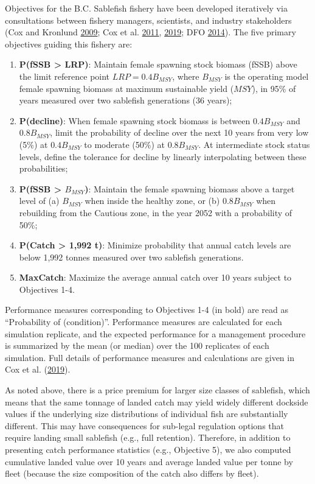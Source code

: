 \documentclass[11pt]{book}
\begin{document}
Objectives for the B.C. Sablefish fishery have been developed iteratively via consultations between fishery managers, scientists, and industry stakeholders (Cox and Kronlund \protect\hyperlink{ref-cox2009evaluation}{2009}; Cox et al. \protect\hyperlink{ref-cox2011management}{2011}, \protect\hyperlink{ref-cox2019evaluating}{2019}; DFO \protect\hyperlink{ref-dfo2014performanc}{2014}). The five primary objectives guiding this fishery are:
\begin{enumerate}
\def\labelenumi{\arabic{enumi}.}

\item
  \textbf{P(fSSB \textgreater{} LRP)}: Maintain female spawning stock biomass (fSSB) above the limit reference point \(LRP = 0.4B_{MSY}\), where \(B_{MSY}\) is the operating model female spawning biomass at maximum sustainable yield (\(MSY\)), in 95\% of years measured over two sablefish generations (36 years);
\item
  \textbf{P(decline)}: When female spawning stock biomass is between \(0.4B_{MSY}\) and \(0.8B_{MSY}\), limit the probability of decline over the next 10 years from very low (5\%) at \(0.4B_{MSY}\) to moderate (50\%) at \(0.8B_{MSY}\). At intermediate stock status levels, define the tolerance for decline by linearly interpolating between these probabilities;
\item
  \textbf{P(fSSB \textgreater{} \(B_{MSY}\))}: Maintain the female spawning biomass above a target level of (a) \(B_{MSY}\) when inside the healthy zone, or (b) \(0.8B_{MSY}\) when rebuilding from the Cautious zone, in the year 2052 with a probability of 50\%;
\item
  \textbf{P(Catch \textgreater{} 1,992 t)}: Minimize probability that annual catch levels are below 1,992 tonnes measured over two sablefish generations.
\item
  \textbf{MaxCatch}: Maximize the average annual catch over 10 years subject to Objectives 1-4.
\end{enumerate}
Performance measures corresponding to Objectives 1-4 (in bold) are read as ``Probability of (condition)''. Performance measures are calculated for each simulation replicate, and the expected performance for a management procedure is summarized by the mean (or median) over the 100 replicates of each simulation. Full details of performance measures and calculations are given in Cox et al. (\protect\hyperlink{ref-cox2019evaluating}{2019}).

As noted above, there is a price premium for larger size classes of sablefish, which means that the same tonnage of landed catch may yield widely different dockside values if the underlying size distributions of individual fish are substantially different. This may have consequences for sub-legal regulation options that require landing small sablefish (e.g., full retention). Therefore, in addition to presenting catch performance statistics (e.g., Objective 5), we also computed cumulative landed value over 10 years and average landed value per tonne by fleet (because the size composition of the catch also differs by fleet).
\end{document}
